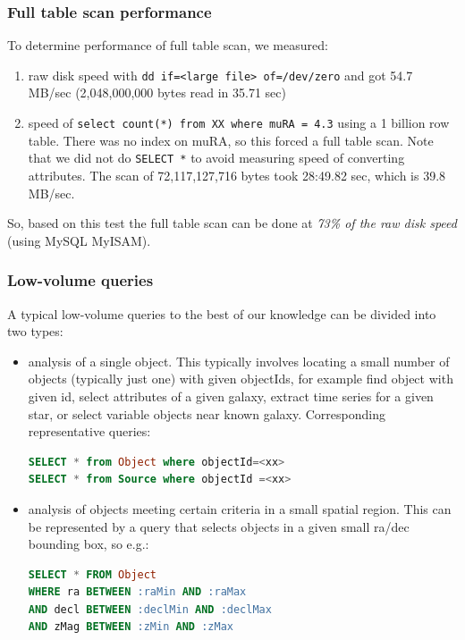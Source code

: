 \documentclass[DM,lsstdraft,toc]{lsstdoc}
\begin{document}
\subsubsection{Full table scan
performance}\label{full-table-scan-performance}

To determine performance of full table scan, we measured:

\begin{enumerate}
\def\labelenumi{\arabic{enumi}.}
\item
  raw disk speed with
  \texttt{dd\ if=\textless{}large\ file\textgreater{}\ of=/dev/zero} and
  got 54.7 MB/sec (2,048,000,000 bytes read in 35.71 sec)
\item
  speed of \texttt{select\ count(*)\ from\ XX\ where\ muRA\ =\ 4.3}
  using a 1 billion row table. There was no index on muRA, so this
  forced a full table scan. Note that we did not do \texttt{SELECT\ *}
  to avoid measuring speed of converting attributes. The scan of
  72,117,127,716 bytes took 28:49.82 sec, which is 39.8 MB/sec.
\end{enumerate}

So, based on this test the full table scan can be done at \emph{73\% of
the raw disk speed} (using MySQL MyISAM).

\subsubsection{Low-volume queries}\label{low-volume-queries}

A typical low-volume queries to the best of our knowledge can be divided
into two types:

\begin{itemize}
\item
  analysis of a single object. This typically involves locating a small
  number of objects (typically just one) with given objectIds, for
  example find object with given id, select attributes of a given
  galaxy, extract time series for a given star, or select variable
  objects near known galaxy. Corresponding representative queries:

\begin{lstlisting}[language=SQL]
SELECT * from Object where objectId=<xx>
SELECT * from Source where objectId =<xx>
\end{lstlisting}
\item
  analysis of objects meeting certain criteria in a small spatial
  region. This can be represented by a query that selects objects in a
  given small ra/dec bounding box, so e.g.:

\begin{lstlisting}[language=SQL]
SELECT * FROM Object
WHERE ra BETWEEN :raMin AND :raMax
AND decl BETWEEN :declMin AND :declMax
AND zMag BETWEEN :zMin AND :zMax
\end{lstlisting}
\end{itemize}
\end{document}
